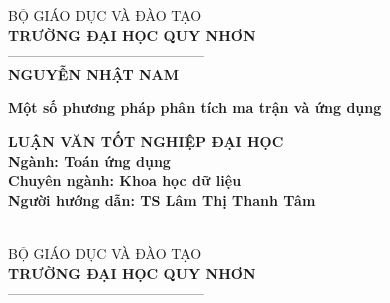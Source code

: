 \documentclass[12pt,a4paper,oneside]{report}
\numberwithin{equation}{section}
\begin{document}
\thispagestyle{empty}
\thisfancypage{\setlength{\fboxsep}{2pt}\setlength{\fboxrule}{2pt}\doublebox}{} 
\begin{center} %
{\fontsize{14pt}{16}\selectfont BỘ GIÁO DỤC VÀ ĐÀO TẠO}\\
\vskip 0.05cm
{\bf\fontsize{14pt}{16}\selectfont TRƯỜNG ĐẠI HỌC QUY NHƠN}\\
{——————————————}\\
\vskip 2cm
{\bf\fontsize{16pt}{22}\selectfont NGUYỄN NHẬT NAM}

\vskip 3cm
\begin{center}
{\bf\fontsize{22pt}{22}\selectfont Một số phương pháp phân tích ma trận và ứng dụng}

\end{center}

\vskip 2.5cm
{\bf\fontsize{16pt}{22}\selectfont LUẬN VĂN TỐT NGHIỆP ĐẠI HỌC}\\
\vskip 0.5cm
{\bf\fontsize{16pt}{22}\selectfont Ngành: Toán ứng dụng }\\
\vskip 0.05cm
{\bf\fontsize{16pt}{22}\selectfont Chuyên ngành: Khoa học dữ liệu}\\
\vskip 2.5cm
{\bf\fontsize{16pt}{22}\selectfont Người hướng dẫn: TS Lâm Thị Thanh Tâm}\\

\vfill
{\bf\fontsize{14pt}{16}\selectfont {Bình Định, 2023}}\\
\end{center}
\newpage
\thispagestyle{empty}


\thisfancypage{\setlength{\fboxsep}{2pt}\setlength{\fboxrule}{2pt}\doublebox}{} 
\begin{center} %
{\fontsize{14pt}{16}\selectfont BỘ GIÁO DỤC VÀ ĐÀO TẠO}\\
\vskip 0.05cm
{\bf\fontsize{14pt}{16}\selectfont TRƯỜNG ĐẠI HỌC QUY NHƠN}\\
{——————————————}\\
\end{center}
\end{document}
